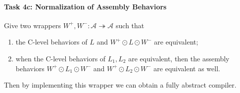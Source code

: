 \vspace*{-2ex}
\paragraph*{Task 4c: Normalization of Assembly Behaviors}

Give two wrappers $W^+, W^- : \mathcal{A} \twoheadrightarrow \mathcal{A}$
such that
\begin{enumerate}
  \item the C-level behaviors of $L$ and $W^+ \odot L \odot W^-$
    are equivalent;
  \item when the C-level behaviors of $L_1, L_2$ are equivalent,
    then the assembly behaviors
    $W^+ \odot L_1 \odot W^-$ and
    $W^+ \odot L_2 \odot W^-$
    are equivalent as well.
\end{enumerate}
Then by implementing this wrapper
we can obtain a fully abstract compiler.
